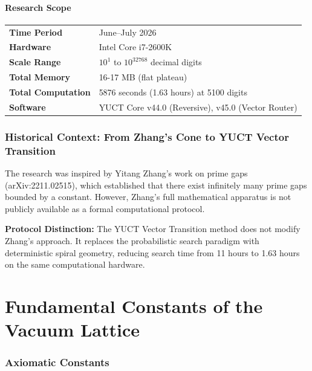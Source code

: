 \documentclass[12pt,a4paper]{article}
\begin{document}
	\subsection{Research Scope}
	
	\begin{tabular}{p{4cm} p{10cm}}
		\textbf{Time Period} & June–July 2026 \\
		\textbf{Hardware} & Intel Core i7-2600K \\
		\textbf{Scale Range} & \(10^1\) to \(10^{32768}\) decimal digits \\
		\textbf{Total Memory} & 16-17 MB (flat plateau) \\
		\textbf{Total Computation} & 5876 seconds (1.63 hours) at 5100 digits \\
		\textbf{Software} & YUCT Core v44.0 (Reversive), v45.0 (Vector Router) \\
	\end{tabular}
	
	\section{Historical Context: From Zhang's Cone to YUCT Vector Transition}
	
	The research was inspired by Yitang Zhang's work on prime gaps (arXiv:2211.02515), which established that there exist infinitely many prime gaps bounded by a constant. However, Zhang's full mathematical apparatus is not publicly available as a formal computational protocol.
	
	\begin{protocolbox}
		\textbf{Protocol Distinction:} The YUCT Vector Transition method does not modify Zhang's approach. It replaces the probabilistic search paradigm with deterministic spiral geometry, reducing search time from 11 hours to 1.63 hours on the same computational hardware.
	\end{protocolbox}
	
	\newpage
	
	\part{Fundamental Constants of the Vacuum Lattice}
	
	\section{Axiomatic Constants}
	
\end{document}
